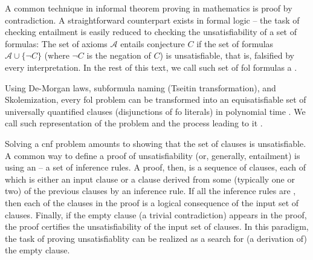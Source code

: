 
A common technique in informal theorem proving in mathematics is proof by contradiction.
A straightforward counterpart exists in formal logic --
the task of checking
entailment is easily reduced to
checking the
unsatisfiability of a set of formulas:
The set of axioms $\mathcal{A}$ entails conjecture $C$ if the set of formulas $\mathcal{A} \cup \{\lnot C\}$ (where $\lnot C$ is the negation of $C$) is unsatisfiable, that is, falsified by every interpretation.
In the rest of this text, we call such set of \gls{fol} formulas a .


Using De-Morgan laws, subformula naming (Tseitin transformation), and Skolemization,
every \gls{fol} problem can be transformed into an equisatisfiable set of universally quantified clauses (disjunctions of \gls{fo} literals) in polynomial time \cite{DBLP:books/el/RV01/NonnengartW01}.
We call such representation of the problem 
and the process leading to it .

Solving a \gls{cnf} problem amounts to showing that the set of clauses is unsatisfiable.
A common way to define a proof of unsatisfiability (or, generally, entailment) is using an  -- a set of inference rules.
A proof, then, is a sequence of clauses,
each of which is either an input clause or a clause derived from some (typically one or two) of the previous clauses by an inference rule.
If all the inference rules are ,
then each of the clauses in the proof is a logical consequence of the input set of clauses.
Finally, if the empty clause (a trivial contradiction) appears in the proof,
the proof certifies the unsatisfiability of the input set of clauses.
In this paradigm, the task of proving unsatisfiablity can be realized as a search for (a derivation of) the empty clause.

